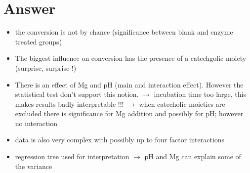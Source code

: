 \documentclass[]{tufte-handout}
\begin{document}
\section{Answer}\label{answer}

\begin{itemize}
\itemsep1pt\parskip0pt
\item
  the conversion is not by chance (significance between blank and enzyme
  treated groups)
\item
  The biggest influence on conversion has the presence of a catechgolic
  moiety (surprise, surprise !)
\item
  There is an effect of Mg and pH (main and interaction effect). However
  the statistical test don't support this notion. \(\rightarrow\)
  incubation time too large, this makes results badly interpretable !!!
  \(\rightarrow\) when catecholic moieties are excluded there is
  significance for Mg addition and possibly for pH; however no
  interaction
\item
  data is also very complex with possibly up to four factor interactions
\item
  regression tree used for interpretation \(\rightarrow\) pH and Mg can
  explain some of the variance
\end{itemize}
\end{document}
